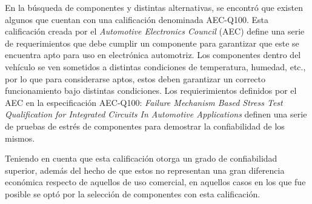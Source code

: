 En la búsqueda de componentes y distintas alternativas, se encontró que existen algunos que cuentan con una calificación denominada AEC-Q100. Esta calificación creada por el \textit{Automotive Electronics Council} (AEC) define una serie de requerimientos que debe cumplir un componente para garantizar que este se encuentra apto para uso en electrónica automotriz. 
Los componentes dentro del vehículo se ven sometidos a distintas condiciones de temperatura, humedad, etc., por lo que para considerarse aptos, estos deben garantizar un correcto funcionamiento bajo distintas condiciones. Los requierimientos definidos por el AEC en la especificación AEC-Q100: \textit{Failure Mechanism Based Stress Test Qualification for Integrated Circuits In Automotive Applications} definen una serie de pruebas de estrés de componentes para demostrar la confiabilidad de los mismos.

Teniendo en cuenta que esta calificación otorga un grado de confiabilidad superior, además del hecho de que estos no representan una gran diferencia económica respecto de aquellos de uso comercial, en aquellos casos en los que fue posible se optó por la selección de componentes con esta calificación.















